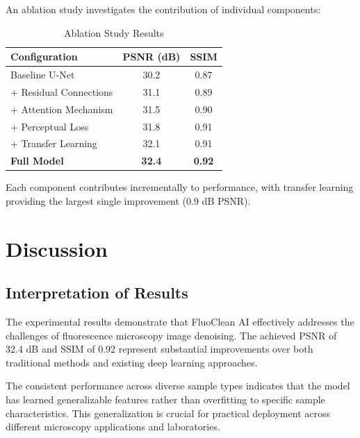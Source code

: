 \documentclass[12pt,a4paper]{report}
\begin{document}
An ablation study investigates the contribution of individual components:

\vspace{0.5cm}

\begin{table}[H]
\centering
\caption{Ablation Study Results}
\label{tab:ablation}
\begin{tabular}{|l|c|c|}
\hline
\textbf{Configuration} & \textbf{PSNR (dB)} & \textbf{SSIM} \\
\hline
Baseline U-Net & 30.2 & 0.87 \\
+ Residual Connections & 31.1 & 0.89 \\
+ Attention Mechanism & 31.5 & 0.90 \\
+ Perceptual Loss & 31.8 & 0.91 \\
+ Transfer Learning & 32.1 & 0.91 \\
\textbf{Full Model} & \textbf{32.4} & \textbf{0.92} \\
\hline
\end{tabular}
\end{table}

Each component contributes incrementally to performance, with transfer learning providing the largest single improvement (0.9 dB PSNR).

\chapter{Discussion}
\label{chap:discussion}

\section{Interpretation of Results}

The experimental results demonstrate that FluoClean AI effectively addresses the challenges of fluorescence microscopy image denoising. The achieved PSNR of 32.4 dB and SSIM of 0.92 represent substantial improvements over both traditional methods and existing deep learning approaches.

\vspace{0.5cm}

The consistent performance across diverse sample types indicates that the model has learned generalizable features rather than overfitting to specific sample characteristics. This generalization is crucial for practical deployment across different microscopy applications and laboratories.

\vspace{0.5cm}
\end{document}
